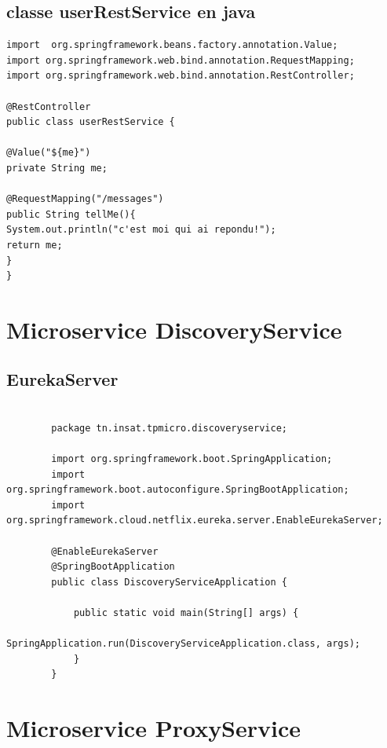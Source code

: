        \section{classe userRestService en java }
      \begin{lstlisting}
import  org.springframework.beans.factory.annotation.Value;
import org.springframework.web.bind.annotation.RequestMapping;
import org.springframework.web.bind.annotation.RestController;

@RestController
public class userRestService {

@Value("${me}")
private String me;

@RequestMapping("/messages")
public String tellMe(){
System.out.println("c'est moi qui ai repondu!");
return me;
}
}
      \end{lstlisting}  
        
        \chapter{Microservice DiscoveryService}
         
           \section*{EurekaServer }
        \begin{lstlisting}
        
        package tn.insat.tpmicro.discoveryservice;
        
        import org.springframework.boot.SpringApplication;
        import org.springframework.boot.autoconfigure.SpringBootApplication;
        import org.springframework.cloud.netflix.eureka.server.EnableEurekaServer;
        
        @EnableEurekaServer
        @SpringBootApplication
        public class DiscoveryServiceApplication {
        	
        	public static void main(String[] args) {
        		SpringApplication.run(DiscoveryServiceApplication.class, args);
        	}
        }    \end{lstlisting}  
    
    
            \chapter{Microservice ProxyService}
